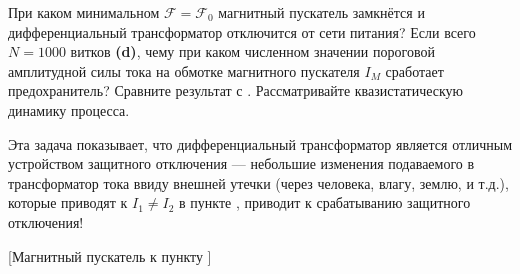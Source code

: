 \begin{task}
    \item При каком минимальном $\mathcal F=\mathcal F_0$ магнитный пускатель замкнётся и дифференциальный трансформатор отключится от сети питания? Если всего $N=1000$ витков \textbf{(d)}, чему при каком численном значении пороговой амплитудной силы тока на обмотке магнитного пускателя $I_M$ сработает предохранитель? Сравните результат с . Рассматривайте квазистатическую динамику процесса.
\end{task}

Эта задача показывает, что дифференциальный трансформатор является отличным устройством защитного отключения --- небольшие изменения подаваемого в трансформатор тока ввиду внешней утечки (через человека, влагу, землю, и т.д.), которые приводят к $I_1\neq I_2$ в пункте , приводит к срабатыванию защитного отключения!

[Магнитный пускатель к пункту ]
